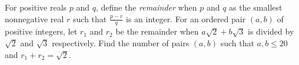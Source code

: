 For positive reals $p$ and $q$, define the \textit{remainder} when $p$ and $q$ as the smallest nonnegative real $r$ such that $\tfrac{p-r}{q}$ is an integer. For an ordered pair $(a, b)$ of positive integers, let $r_1$ and $r_2$ be the remainder when $a\sqrt{2} + b\sqrt{3}$ is divided by $\sqrt{2}$ and $\sqrt{3}$ respectively. Find the number of pairs $(a, b)$ such that $a, b \le 20$ and $r_1 + r_2 = \sqrt{2}$.